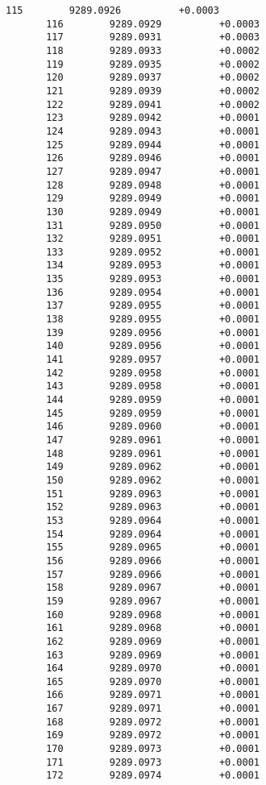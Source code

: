 \documentclass[11pt]{article}
\begin{document}
\begin{Verbatim}[commandchars=\\\{\}]
       115        9289.0926          +0.0003
       116        9289.0929          +0.0003
       117        9289.0931          +0.0003
       118        9289.0933          +0.0002
       119        9289.0935          +0.0002
       120        9289.0937          +0.0002
       121        9289.0939          +0.0002
       122        9289.0941          +0.0002
       123        9289.0942          +0.0001
       124        9289.0943          +0.0001
       125        9289.0944          +0.0001
       126        9289.0946          +0.0001
       127        9289.0947          +0.0001
       128        9289.0948          +0.0001
       129        9289.0949          +0.0001
       130        9289.0949          +0.0001
       131        9289.0950          +0.0001
       132        9289.0951          +0.0001
       133        9289.0952          +0.0001
       134        9289.0953          +0.0001
       135        9289.0953          +0.0001
       136        9289.0954          +0.0001
       137        9289.0955          +0.0001
       138        9289.0955          +0.0001
       139        9289.0956          +0.0001
       140        9289.0956          +0.0001
       141        9289.0957          +0.0001
       142        9289.0958          +0.0001
       143        9289.0958          +0.0001
       144        9289.0959          +0.0001
       145        9289.0959          +0.0001
       146        9289.0960          +0.0001
       147        9289.0961          +0.0001
       148        9289.0961          +0.0001
       149        9289.0962          +0.0001
       150        9289.0962          +0.0001
       151        9289.0963          +0.0001
       152        9289.0963          +0.0001
       153        9289.0964          +0.0001
       154        9289.0964          +0.0001
       155        9289.0965          +0.0001
       156        9289.0966          +0.0001
       157        9289.0966          +0.0001
       158        9289.0967          +0.0001
       159        9289.0967          +0.0001
       160        9289.0968          +0.0001
       161        9289.0968          +0.0001
       162        9289.0969          +0.0001
       163        9289.0969          +0.0001
       164        9289.0970          +0.0001
       165        9289.0970          +0.0001
       166        9289.0971          +0.0001
       167        9289.0971          +0.0001
       168        9289.0972          +0.0001
       169        9289.0972          +0.0001
       170        9289.0973          +0.0001
       171        9289.0973          +0.0001
       172        9289.0974          +0.0001

\end{Verbatim}
\end{document}
